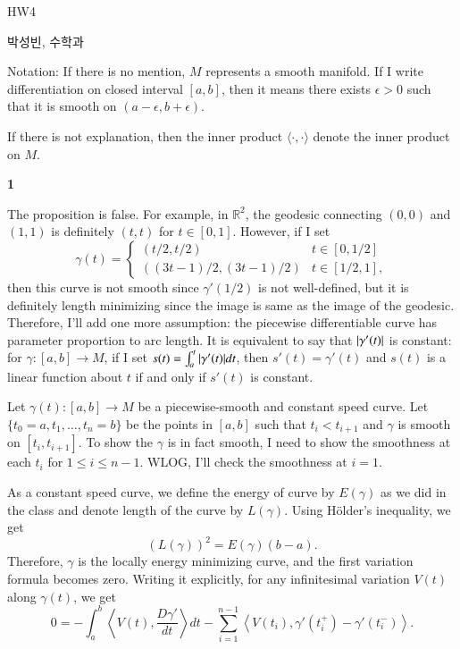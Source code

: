 \documentclass[a4paper, 12pt]{article}
\theoremstyle{Mydefinition}
\theoremstyle{Mytheorem}
\begin{document}
\thispagestyle{myfirstpage}
\begin{center}
    \Large{HW4}
\end{center}
박성빈, 수학과

Notation: If there is no mention, $M$ represents a smooth manifold. If I write differentiation on closed interval $[a,b]$, then it means there exists $\epsilon>0$ such that it is smooth on $(a-\epsilon, b+\epsilon)$.

If there is not explanation, then the inner product $\langle \cdot, \cdot \rangle$ denote the inner product on $M$.

\noindent \textbf{1}

The proposition is false. For example, in $\mathbb{R}^2$, the geodesic connecting $(0,0)$ and $(1,1)$ is definitely $(t,t)$ for $t\in [0,1]$. However, if I set 
\begin{equation}
    \gamma(t) = \begin{cases}
        (t/2, t/2) & t\in [0,1/2] \\
        ((3t-1)/2, (3t-1)/2) & t\in [1/2, 1],
    \end{cases}
\end{equation}
then this curve is not smooth since $\gamma'(1/2)$ is not well-defined, but it is definitely length minimizing since the image is same as the image of the geodesic. Therefore, I'll add one more assumption: the piecewise differentiable curve has parameter proportion to arc length. It is equivalent to say that $\abs{\gamma'(t)}$ is constant: for $\gamma:[a,b]\rightarrow M$, if I set $s(t) = \int_a^t \abs{\gamma'(t)}dt$, then $s'(t) = \gamma'(t)$ and $s(t)$ is a linear function about $t$ if and only if $s'(t)$ is constant.

Let $\gamma(t):[a,b]\rightarrow M$ be a piecewise-smooth and constant speed curve. Let $\{t_0 = a, t_1, \ldots, t_n = b\}$ be the points in $[a,b]$ such that $t_i<t_{i+1}$ and $\gamma$ is smooth on $[t_i, t_{i+1}]$. To show the $\gamma$ is in fact smooth, I need to show the smoothness at each $t_i$ for $1\leq i\leq n-1$. WLOG, I'll check the smoothness at $i=1$.

As a constant speed curve, we define the energy of curve by $E(\gamma)$ as we did in the class and denote length of the curve by $L(\gamma)$. Using H\"older's inequality, we get
\begin{equation}
    \left(L(\gamma)\right)^2 = E(\gamma)(b-a).
\end{equation}
Therefore, $\gamma$ is the locally energy minimizing curve, and the first variation formula becomes zero. Writing it explicitly, for any infinitesimal variation $V(t)$ along $\gamma(t)$, we get
\begin{equation}
    0 = -\int_a^b\left\langle V(t), \frac{D\gamma'}{dt}\right\rangle dt - \sum_{i=1}^{n-1} \left\langle V(t_i), \gamma'(t_i^+)-\gamma'(t_i^-)\right\rangle.
\end{equation}
\end{document}

